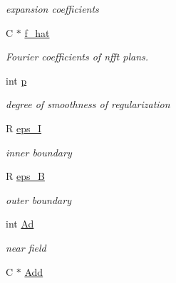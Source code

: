 \begin{DoxyCompactItemize}
\begin{DoxyCompactList}\small\item\em expansion coefficients \end{DoxyCompactList}\item 
\hypertarget{structfastsum__plan___a70d787a0aea3df12ce5c34b74058face}{C $\ast$ \hyperlink{structfastsum__plan___a70d787a0aea3df12ce5c34b74058face}{f\-\_\-hat}}\label{structfastsum__plan___a70d787a0aea3df12ce5c34b74058face}

\begin{DoxyCompactList}\small\item\em Fourier coefficients of nfft plans. \end{DoxyCompactList}\item 
\hypertarget{structfastsum__plan___a236982e68b9354c7edb47eeff18e05bf}{int \hyperlink{structfastsum__plan___a236982e68b9354c7edb47eeff18e05bf}{p}}\label{structfastsum__plan___a236982e68b9354c7edb47eeff18e05bf}

\begin{DoxyCompactList}\small\item\em degree of smoothness of regularization \end{DoxyCompactList}\item 
\hypertarget{structfastsum__plan___aff41332f42a4f22450c6e0748f9e1432}{R \hyperlink{structfastsum__plan___aff41332f42a4f22450c6e0748f9e1432}{eps\-\_\-\-I}}\label{structfastsum__plan___aff41332f42a4f22450c6e0748f9e1432}

\begin{DoxyCompactList}\small\item\em inner boundary \end{DoxyCompactList}\item 
\hypertarget{structfastsum__plan___a97e40c8514a1b2b86de2e5532f875c5b}{R \hyperlink{structfastsum__plan___a97e40c8514a1b2b86de2e5532f875c5b}{eps\-\_\-\-B}}\label{structfastsum__plan___a97e40c8514a1b2b86de2e5532f875c5b}

\begin{DoxyCompactList}\small\item\em outer boundary \end{DoxyCompactList}\item 
int \hyperlink{structfastsum__plan___a29d4d3dc57d0b1713444efcfddf1b5ef}{Ad}
\begin{DoxyCompactList}\small\item\em near field \end{DoxyCompactList}\item 
\hypertarget{structfastsum__plan___abc039879bb29d9eae051fbac46827f79}{C $\ast$ \hyperlink{structfastsum__plan___abc039879bb29d9eae051fbac46827f79}{Add}}\label{structfastsum__plan___abc039879bb29d9eae051fbac46827f79}


\end{DoxyCompactItemize}
